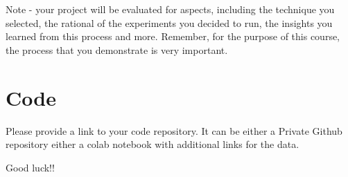 \documentclass{article}
\begin{document}
Note - your project will be evaluated for aspects, including the technique you selected, the rational of the experiments you decided to run, the insights you learned from this process and more. Remember, for the purpose of this course, the process that you demonstrate is very  important.

\section{Code}

Please provide a link to your code repository. It can be either a Private Github repository either a colab notebook with additional links for the data.


Good luck!!


\end{document}

